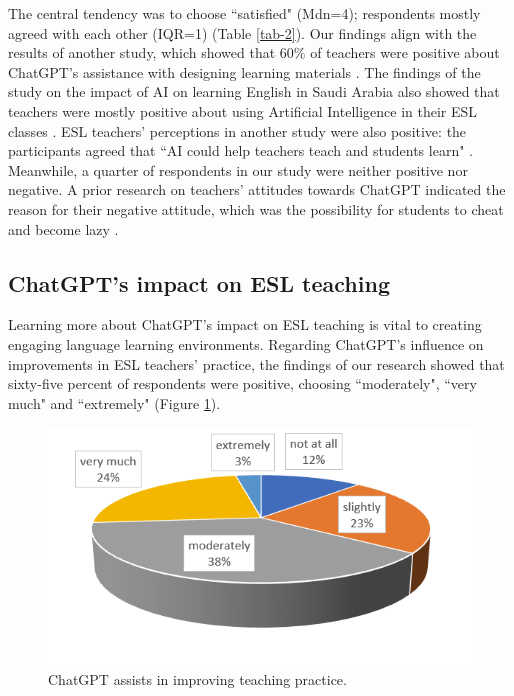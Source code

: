 \documentclass[english]{textolivre}
\begin{document}
The central tendency was to choose ``satisfied" (Mdn=4); respondents mostly agreed with each other (IQR=1) (Table \ref{tab-2}). Our findings align with the results of another study, which showed that 60\% of teachers were positive about ChatGPT’s assistance with designing learning materials \cite[p. 16]{nguyen2023}. The findings of the study on the impact of AI on learning English in Saudi Arabia also showed that teachers were mostly positive about using Artificial Intelligence in their ESL classes \cite[p. 36]{aljohani2021}. ESL teachers’ perceptions in another study were also positive: the participants agreed that ``AI could help teachers teach and students learn" \cite[p. 232]{sumakul2022}. Meanwhile, a quarter of respondents in our study were neither positive nor negative. A prior research on teachers’ attitudes towards ChatGPT indicated the reason for their negative attitude, which was the possibility for students to cheat and become lazy \cite[p. 102]{iqbal2023}.

\subsection{ChatGPT’s impact on ESL teaching}
Learning more about ChatGPT’s impact on ESL teaching is vital to creating engaging language learning environments. Regarding ChatGPT’s influence on improvements in ESL teachers’ practice, the findings of our research showed that sixty-five percent of respondents were positive, choosing ``moderately", ``very much" and ``extremely" (Figure \ref{fig-7}).

\begin{figure}[h!]
    \centering
    \begin{minipage}{0.70\linewidth}
    \includegraphics[width=\linewidth]{Imagens/Figure7.png}
    \caption{ChatGPT assists in improving teaching practice.}
    \label{fig-7}
    \end{minipage}
\end{figure}
\end{document}
